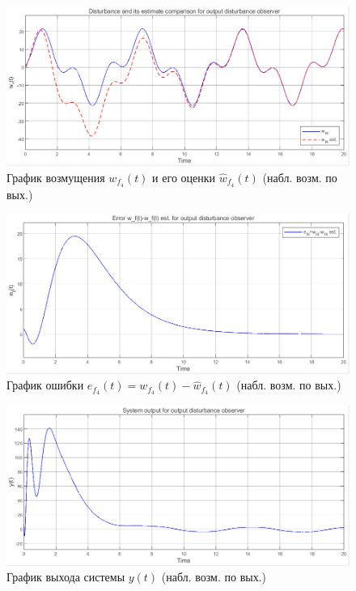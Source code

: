 \documentclass[a4paper, 12pt]{article}
\begin{document}
    \begin{figure}[H]
        \centering
        \includegraphics[scale=0.6]{3task_wfhwf42.png}
        \captionsetup{skip=0pt}
        \caption{График возмущения $w_{f_4}(t)$ и его оценки $\hat{w}_{f_4}(t)$ (набл. возм. по вых.)}
        \label{fig:3task_wfhwf42}
    \end{figure}
    \begin{figure}[H]
        \centering
        \includegraphics[scale=0.6]{3task_ef42.png}
        \captionsetup{skip=0pt}
        \caption{График ошибки $e_{f_4}(t)=w_{f_4}(t)-\hat{w}_{f_4}(t)$ (набл. возм. по вых.)}
        \label{fig:3task_ef42}
    \end{figure}
    \begin{figure}[H]
        \centering
        \includegraphics[scale=0.6]{3task_y2.png}
        \captionsetup{skip=0pt}
        \caption{График выхода системы $y(t)$ (набл. возм. по вых.)}
        \label{fig:3task_y2}
    \end{figure}
\end{document}
